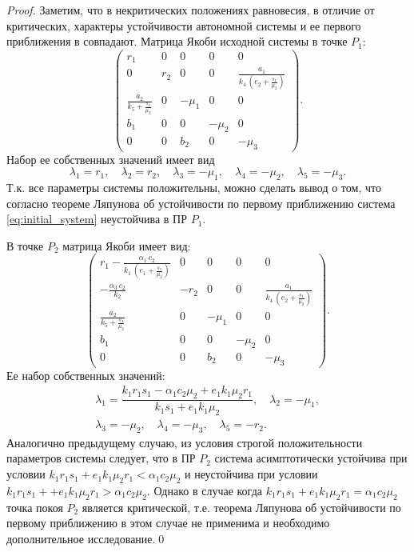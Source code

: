 \documentclass[14pt,a4paper]{extarticle}
\begin{document}
	\begin{proof}
		Заметим, что в некритических положениях равновесия, в отличие от критических, характеры устойчивости автономной системы и ее первого приближения в совпадают.
		Матрица Якоби исходной системы в точке $P_1$:
		\[\begin{pmatrix}
			r_{1} & 0 & 0 & 0 & 0\\ 
			0 & r_{2} & 0 & 0 & \frac{a_{1}}{k_{4}\,\left(e_{2}+\frac{s_{1}}{\mu _{2}}\right)}\\ 
			\frac{a_{2}}{k_{5}+\frac{s_{1}}{\mu _{2}}} & 0 & -\mu _{1} & 0 & 0\\ 
			b_{1} & 0 & 0 & -\mu _{2} & 0\\ 
			0 & 0 & b_{2} & 0 & -\mu _{3} 
		\end{pmatrix}.\]
		Набор ее собственных значений имеет вид
		\[\lambda_1=r_1,\quad \lambda_2=r_2,\quad \lambda_3=-\mu_1,\quad \lambda_4=-\mu_2,\quad \lambda_5=-\mu_3.\]
		Т.к. все параметры системы положительны, можно сделать вывод о том, что согласно теореме Ляпунова об устойчивости по первому приближению система \ref{eq:initial_system} неустойчива в ПР $P_1$.
		
		В точке $P_2$ матрица Якоби имеет вид:
		\[\begin{pmatrix}
			r_{1}-\frac{\alpha _{1}\,c_{2}}{k_{1}\,\left(e_{1}+\frac{s_{1}}{\mu _{2}}\right)} & 0 & 0 & 0 & 0\\ 
			-\frac{\alpha _{3}\,c_{2}}{k_{2}} & -r_{2} & 0 & 0 & \frac{a_{1}}{k_{4}\,\left(e_{2}+\frac{s_{1}}{\mu _{2}}\right)}\\ 
			\frac{a_{2}}{k_{5}+\frac{s_{1}}{\mu _{2}}} & 0 & -\mu _{1} & 0 & 0\\ 
			b_{1} & 0 & 0 & -\mu _{2} & 0\\ 
			0 & 0 & b_{2} & 0 & -\mu _{3}
		\end{pmatrix}.\]
		Ее набор собственных значений:
		\begin{multline*}
		\lambda_1=\dfrac{k_1r_1s_1 - \alpha_1c_2\mu_2 + e_1k_1\mu_2r_1}{k_1s_1 + e_1k_1\mu_2},\quad \lambda_2=-\mu_1,\\
		\lambda_3=-\mu_2,\quad \lambda_4=-\mu_3,\quad \lambda_5=-r_2.
		\end{multline*}
		Аналогично предыдущему случаю, из условия строгой положительности параметров системы следует, что в ПР $P_2$ система асимптотически устойчива при условии $k_1r_1s_1 + e_1k_1\mu_2r_1< \alpha_1c_2\mu_2$ и неустойчива при условии $k_1r_1s_1 + + e_1k_1\mu_2r_1>\alpha_1c_2\mu_2$. Однако в случае когда $k_1r_1s_1 + e_1k_1\mu_2r_1=\alpha_1c_2\mu_2$ точка покоя $P_2$ является критической, т.е. теорема Ляпунова об устойчивости по первому приближению в этом случае не применима и необходимо дополнительное исследование.\qed
	\end{proof}
	
\end{document}
